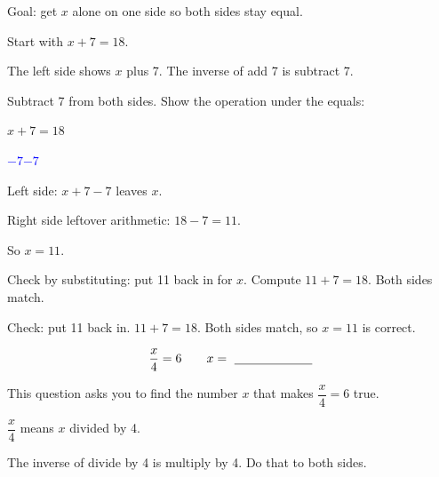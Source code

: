 \begin{steps}
  \item Goal: get $x$ alone on one side so both sides stay equal.
  \item Start with $x + 7 = 18$.
  \item The left side shows $x$ plus 7. The inverse of add 7 is subtract 7.
  \item Subtract 7 from both sides. Show the operation under the equals:
        \begin{center}
          $x + 7 = 18$\par\smallskip
          \underline{\hspace{0.6em}\textcolor{blue}{$-7$}\hspace{1.6em}\textcolor{blue}{$-7$}\hspace{0.6em}}
        \end{center}
  \item Left side: $x + 7 - 7$ leaves $x$.
  \item Right side leftover arithmetic: $18 - 7 = 11$.
  \item So $x = 11$.
  \item Check by substituting: put 11 back in for $x$. Compute $11 + 7 = 18$.
        Both sides match.
\end{steps}


Check: put 11 back in. $11 + 7 = 18$. Both sides match, so $x = 11$ is correct.


\[ \frac{x}{4} = 6 \qquad x = \ \underline{\hspace{2.2cm}} \]


This question asks you to find the number $x$ that makes $\dfrac{x}{4} = 6$ true.

\begin{words}
  \item $\dfrac{x}{4}$ means $x$ divided by 4.
  \item The inverse of divide by 4 is multiply by 4. Do that to both sides.
\end{words}

